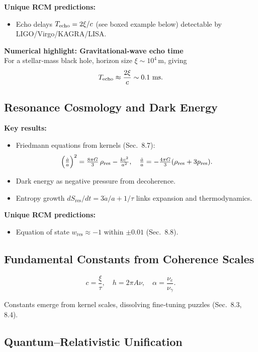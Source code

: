 \textbf{Unique RCM predictions:}
\begin{itemize}
  \item Echo delays $T_{\rm echo}=2\xi/c$ (see boxed example below) detectable by LIGO/Virgo/KAGRA/LISA.
\end{itemize}

\begin{framed}
\noindent\textbf{Numerical highlight: Gravitational‐wave echo time}\\
For a stellar‐mass black hole, horizon size $\xi\sim10^{4}\,\mathrm{m}$, giving 
\[
T_{\rm echo}\approx \frac{2\xi}{c}\sim0.1~\mathrm{ms}.
\]
\end{framed}

\subsection{Resonance Cosmology and Dark Energy}

\textbf{Key results:}
\begin{itemize}
  \item Friedmann equations from kernels (Sec.~8.7):
    \[
      \Bigl(\tfrac{\dot a}{a}\Bigr)^2
      = \tfrac{8\pi G}{3}\,\rho_{\mathrm{res}}
      - \tfrac{k c^2}{a^2}, 
      \quad
      \tfrac{\ddot a}{a}
      = -\tfrac{4\pi G}{3}(\rho_{\mathrm{res}}+3p_{\mathrm{res}}).
    \]
  \item Dark energy as negative pressure from decoherence.
  \item Entropy growth $dS_{\mathrm{res}}/dt=3\dot a/a+1/\tau$ links expansion and thermodynamics.
\end{itemize}

\textbf{Unique RCM predictions:}
\begin{itemize}
  \item Equation of state $w_{\mathrm{res}}\approx-1$ within $\pm0.01$ (Sec.~8.8).
\end{itemize}

\subsection{Fundamental Constants from Coherence Scales}

\[
  c=\frac{\xi}{\tau},\quad
  h=2\pi A\nu,\quad
  \alpha=\frac{\nu_e}{\nu_\gamma}.
\]

Constants emerge from kernel scales, dissolving fine‐tuning puzzles (Sec.~8.3, 8.4).

\subsection{Quantum–Relativistic Unification}

